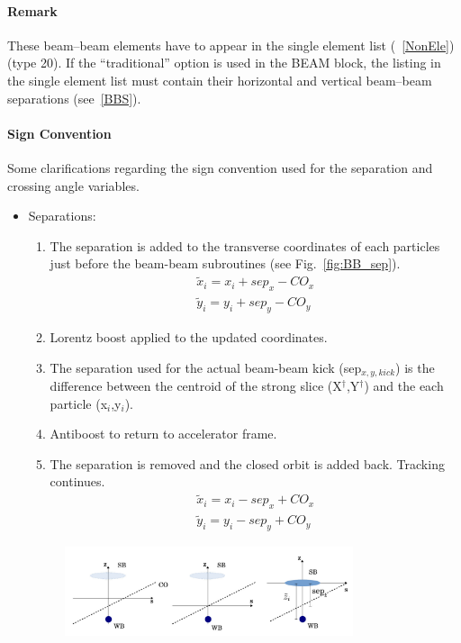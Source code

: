 \documentclass[a4paper,11pt]{report}
\begin{document}
\paragraph{Remark} These beam--beam elements have to appear in the single element list (~\ref{NonEle}) (type 20).
If the ``traditional'' option is used in the BEAM block, the listing in the single element list must contain their horizontal and vertical beam--beam separations (see~\ref{BBS}).

\paragraph{Sign Convention} Some clarifications regarding the sign convention used
for the separation and crossing angle variables.
\begin{itemize}
 \item Separations:
 \begin{enumerate}
  \item The separation is added to the transverse coordinates of each particles just before the beam-beam subroutines (see Fig.~\ref{fig:BB_sep}).
  \begin{eqnarray*}
   \tilde x_i=x_i+sep_x-CO_x \\
   \tilde y_i=y_i+sep_y-CO_y 
  \end{eqnarray*}
  \item Lorentz boost applied to the updated coordinates.
  \item The separation used for the actual beam-beam kick (sep$_{x,y,kick}$) is the difference between the centroid of the strong slice (X$^{\dag}$,Y$^{\dag}$) and the each particle (x$_i$,y$_i$).
  \item Antiboost to return to accelerator frame.
  \item The separation is removed and the closed orbit is added back. Tracking continues.
  \begin{eqnarray*}
   \tilde x_i=x_i-sep_x+CO_x \\
   \tilde y_i=y_i-sep_y+CO_y
   \end{eqnarray*}
 \end{enumerate}
 \begin{figure}[h]
 \begin{center}
 \includegraphics[width=0.8\textwidth]{BB_sep}

\end{center}
\end{figure}
\end{itemize}
\end{document}
